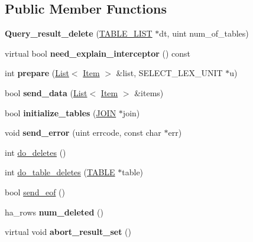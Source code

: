 \subsection*{Public Member Functions}
\begin{DoxyCompactItemize}
\item 
\mbox{\label{classQuery__result__delete_aafce0386a4e82f38c76b01c2241b2ac1}} 
{\bfseries Query\+\_\+result\+\_\+delete} (\mbox{\hyperlink{structTABLE__LIST}{T\+A\+B\+L\+E\+\_\+\+L\+I\+ST}} $\ast$dt, uint num\+\_\+of\+\_\+tables)
\item 
\mbox{\label{classQuery__result__delete_accd7d530ded0f9c82ef3aa9a77a660d7}} 
virtual bool {\bfseries need\+\_\+explain\+\_\+interceptor} () const
\item 
\mbox{\label{classQuery__result__delete_aaa1d57b04bd180bc312d82511e9d7f72}} 
int {\bfseries prepare} (\mbox{\hyperlink{classList}{List}}$<$ \mbox{\hyperlink{classItem}{Item}} $>$ \&list, S\+E\+L\+E\+C\+T\+\_\+\+L\+E\+X\+\_\+\+U\+N\+IT $\ast$u)
\item 
\mbox{\label{classQuery__result__delete_a15540e52017f710d96fafc29bebc6c7b}} 
bool {\bfseries send\+\_\+data} (\mbox{\hyperlink{classList}{List}}$<$ \mbox{\hyperlink{classItem}{Item}} $>$ \&items)
\item 
\mbox{\label{classQuery__result__delete_acc67ca9c87c9060dbac1c49d7c0d4848}} 
bool {\bfseries initialize\+\_\+tables} (\mbox{\hyperlink{classJOIN}{J\+O\+IN}} $\ast$join)
\item 
\mbox{\label{classQuery__result__delete_a7e4da210ced0a1cdc53fdde25f86b524}} 
void {\bfseries send\+\_\+error} (uint errcode, const char $\ast$err)
\item 
int \mbox{\hyperlink{classQuery__result__delete_a7e1b51ad966a65afa34e0fc07c5b7a63}{do\+\_\+deletes}} ()
\item 
int \mbox{\hyperlink{classQuery__result__delete_a3470143ccd887b6ad5bb21d4fe18ef51}{do\+\_\+table\+\_\+deletes}} (\mbox{\hyperlink{structTABLE}{T\+A\+B\+LE}} $\ast$table)
\item 
bool \mbox{\hyperlink{classQuery__result__delete_a1292584b77b4d906a945cf2bf2722a95}{send\+\_\+eof}} ()
\item 
\mbox{\label{classQuery__result__delete_aa3c71d4202e1017c5968f3d66c67949d}} 
ha\+\_\+rows {\bfseries num\+\_\+deleted} ()
\item 
\mbox{\label{classQuery__result__delete_a27d3e88475dcdb116dfe6e13b6b9162b}} 
virtual void {\bfseries abort\+\_\+result\+\_\+set} ()
\end{DoxyCompactItemize}


